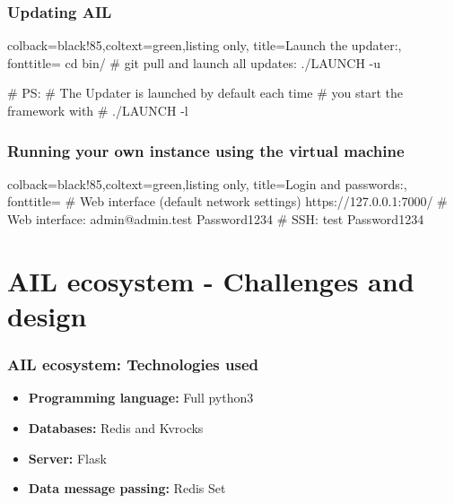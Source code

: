 \documentclass[aspectratio=169]{beamer}
\begin{document}
\begin{frame}[fragile]
    \frametitle{Updating AIL}
    \begin{tcblisting}{colback=black!85,coltext=green,listing only,
        title=Launch the updater:, fonttitle=\bfseries}
cd bin/
# git pull and launch all updates:
./LAUNCH -u


# PS:
# The Updater is launched by default each time
# you start the framework with
# ./LAUNCH -l
\end{tcblisting}

\end{frame}

\begin{frame}[fragile]
   \frametitle{Running your own instance using the virtual machine}
   \begin{tcblisting}{colback=black!85,coltext=green,listing only,
       title=Login and passwords:, fonttitle=\bfseries}
# Web interface (default network settings)
   https://127.0.0.1:7000/
# Web interface:
   admin@admin.test
   Password1234
# SSH:
   test
   Password1234
\end{tcblisting}
\end{frame}


\section{AIL ecosystem - Challenges and design}

\begin{frame}
    \frametitle{AIL ecosystem: Technologies used}
    \begin{itemize}
        \item[] \textbf{Programming language:} Full python3
        \item[] \textbf{Databases:} Redis and Kvrocks
        \item[] \textbf{Server:} Flask
        \item[] \textbf{Data message passing:} Redis Set
    \end{itemize}
\end{frame}
\end{document}
